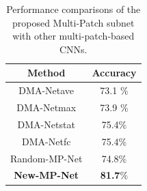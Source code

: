 \documentclass[10pt,twocolumn,letterpaper]{article}
\begin{document}
\begin{table}
	\begin{center}	
		\begin{tabular}{||c|c||} 
			\hline
			Method & Accuracy \\
			\hline\hline
			DMA-Net{\tiny ave} & 73.1 $\%$ \\
			DMA-Net{\tiny max} & 73.9 $\%$ \\
			DMA-Net{\tiny stat} & 75.4$\% $ \\
			DMA-Net{\tiny fc} & 75.4$\% $ \\
			\hline
			Random-MP-Net & 74.8$\%$ \\
			\textbf{New-MP-Net} & \textbf{81.7$\% $}\\
			\hline
		\end{tabular} 
	\end{center} 
	\caption{Performance comparisons of the proposed Multi-Patch subnet with other multi-patch-based CNNs.}
	\label{tabel1} 
	\vspace{-1mm}
\end{table}

\end{document}
